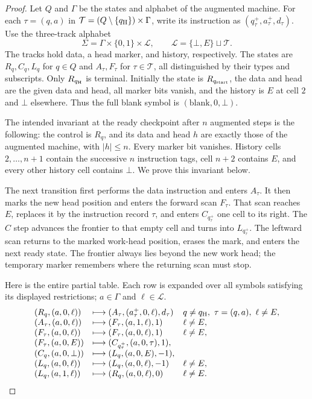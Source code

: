 \documentclass[11pt]{article}
\theoremstyle{remark}\newtheorem{remark}[theorem]{Remark}
\begin{document}
\begin{proof}
Let $Q$ and $\Gamma$ be the states and alphabet of the augmented machine.
For each $\tau=(q,a)$ in
$\mathcal T=(Q\setminus\{q_{\rm H}\})\times\Gamma$, write its
instruction as $(q_\tau^+,a_\tau^+,d_\tau)$.  Use the three-track alphabet
\[
 \Sigma=\Gamma\times\{0,1\}\times\mathcal L,
 \qquad \mathcal L=\{\bot,E\}\sqcup\mathcal T.
\]
The tracks hold data, a head marker, and history, respectively.  The
states are $R_q,C_q,L_q$ for $q\in Q$ and $A_\tau,F_\tau$ for
$\tau\in\mathcal T$, all distinguished by their types and subscripts.
Only $R_{q_{\rm H}}$ is terminal.  Initially the state is
$R_{q_{\rm start}}$, the data and head are the given data and head, all
marker bits vanish, and the history is $E$ at cell $2$ and $\bot$
elsewhere.  Thus the full blank symbol is $(\text{blank},0,\bot)$.

The intended invariant at the ready checkpoint after $n$ augmented
steps is the following: the control is $R_q$, and its data and head $h$
are exactly those of the augmented machine, with $|h|\le n$. Every
marker bit vanishes. History cells $2,\ldots,n+1$ contain the successive
$n$ instruction tags, cell $n+2$ contains $E$, and every other history
cell contains $\bot$. We prove this invariant below.

The next transition first performs the data instruction and enters
$A_\tau$. It then marks the new head position and enters the forward
scan $F_\tau$. That scan reaches $E$, replaces it by the instruction
record $\tau$, and enters $C_{q_\tau^+}$ one cell to its right.
The $C$ step advances the frontier to that empty cell and turns into
$L_{q_\tau^+}$. The leftward scan returns to the marked work-head
position, erases the mark, and enters the next ready state. The
frontier always lies beyond the new work head; the temporary marker
remembers where the returning scan must stop.

Here is the entire partial table.  Each row is expanded over all
symbols satisfying its displayed restrictions; $a\in\Gamma$ and
$\ell\in\mathcal L$.
\begin{equation}\label{eq:compiler-table}
\begin{array}{lll}
(R_q,(a,0,\ell)) &\longmapsto
 (A_\tau,(a_\tau^+,0,\ell),d_\tau)
 &q\ne q_{\rm H},\ \tau=(q,a),\ \ell\ne E,\\
(A_\tau,(a,0,\ell)) &\longmapsto
 (F_\tau,(a,1,\ell),1)&\ell\ne E,\\
(F_\tau,(a,0,\ell)) &\longmapsto
 (F_\tau,(a,0,\ell),1)&\ell\ne E,\\
(F_\tau,(a,0,E)) &\longmapsto
 (C_{q_\tau^+},(a,0,\tau),1),&\\
(C_q,(a,0,\bot)) &\longmapsto
 (L_q,(a,0,E),-1),&\\
(L_q,(a,0,\ell)) &\longmapsto
 (L_q,(a,0,\ell),-1)&\ell\ne E,\\
(L_q,(a,1,\ell)) &\longmapsto
 (R_q,(a,0,\ell),0)&\ell\ne E.
\end{array}
\end{equation}


\end{proof}
\end{document}
